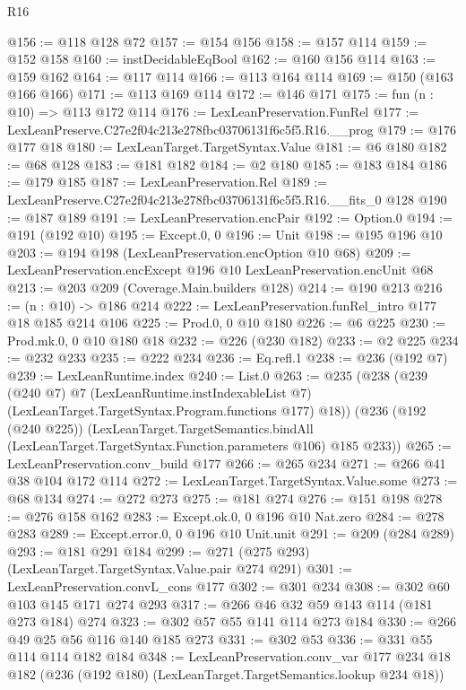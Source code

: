 \begin{lexlean}{R16}
\begin{coremodule}
@156 := @118 @128 @72
@157 := @154 @156
@158 := @157 @114
@159 := @152 @158
@160 := instDecidableEqBool
@162 := @160 @156 @114
@163 := @159 @162
@164 := @117 @114
@166 := @113 @164 @114
@169 := @150 (@163 @166 @166)
@171 := @113 @169 @114
@172 := @146 @171
@175 := fun (n : @10) => @113 @172 @114
@176 := LexLeanPreservation.FunRel
@177 := LexLeanPreserve.C27e2f04c213e278fbc03706131f6c5f5.R16.__prog
@179 := @176 @177 @18
@180 := LexLeanTarget.TargetSyntax.Value
@181 := @6 @180
@182 := @68 @128
@183 := @181 @182
@184 := @2 @180
@185 := @183 @184
@186 := @179 @185
@187 := LexLeanPreservation.Rel
@189 := LexLeanPreserve.C27e2f04c213e278fbc03706131f6c5f5.R16.__fits_0 @128
@190 := @187 @189
@191 := LexLeanPreservation.encPair
@192 := Option.{0}
@194 := @191 (@192 @10)
@195 := Except.{0, 0}
@196 := Unit
@198 := @195 @196 @10
@203 := @194 @198 (LexLeanPreservation.encOption @10 @68)
@209 := LexLeanPreservation.encExcept @196 @10 LexLeanPreservation.encUnit @68
@213 := @203 @209 (Coverage.Main.builders @128)
@214 := @190 @213
@216 := (n : @10) -> @186 @214
@222 := LexLeanPreservation.funRel_intro @177 @18 @185 @214 @106
@225 := Prod.{0, 0} @10 @180
@226 := @6 @225
@230 := Prod.mk.{0, 0} @10 @180 @18
@232 := @226 (@230 @182)
@233 := @2 @225
@234 := @232 @233
@235 := @222 @234
@236 := Eq.refl.{1}
@238 := @236 (@192 @7)
@239 := LexLeanRuntime.index
@240 := List.{0}
@263 := @235
    (@238
      (@239
        (@240 @7)
        @7
        (LexLeanRuntime.instIndexableList @7)
        (LexLeanTarget.TargetSyntax.Program.functions @177)
        @18))
    (@236
      (@192 (@240 @225))
      (LexLeanTarget.TargetSemantics.bindAll
        (LexLeanTarget.TargetSyntax.Function.parameters @106)
        @185
        @233))
@265 := LexLeanPreservation.conv_build @177
@266 := @265 @234
@271 := @266 @41 @38 @104 @172 @114
@272 := LexLeanTarget.TargetSyntax.Value.some
@273 := @68 @134
@274 := @272 @273
@275 := @181 @274
@276 := @151 @198
@278 := @276 @158 @162
@283 := Except.ok.{0, 0} @196 @10 Nat.zero
@284 := @278 @283
@289 := Except.error.{0, 0} @196 @10 Unit.unit
@291 := @209 (@284 @289)
@293 := @181 @291 @184
@299 := @271 (@275 @293) (LexLeanTarget.TargetSyntax.Value.pair @274 @291)
@301 := LexLeanPreservation.convL_cons @177
@302 := @301 @234
@308 := @302 @60 @103 @145 @171 @274 @293
@317 := @266 @46 @32 @59 @143 @114 (@181 @273 @184) @274
@323 := @302 @57 @55 @141 @114 @273 @184
@330 := @266 @49 @25 @56 @116 @140 @185 @273
@331 := @302 @53
@336 := @331 @55 @114 @114 @182 @184
@348 := LexLeanPreservation.conv_var
    @177
    @234
    @18
    @182
    (@236 (@192 @180) (LexLeanTarget.TargetSemantics.lookup @234 @18))

\end{coremodule}
\end{lexlean}

